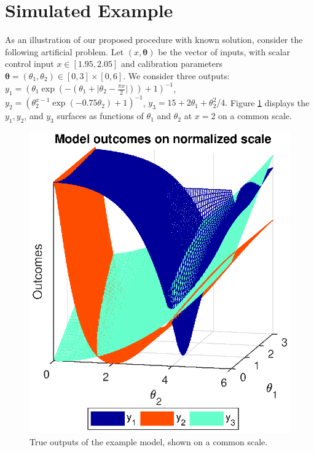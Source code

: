 \documentclass[12pt]{article}
\begin{document}
\section{Simulated Example}\label{example}
As an illustration of our proposed procedure with known solution, consider the following artificial problem. 
%
Let $(x,\boldsymbol \theta)$ be the vector of inputs, with scalar control input $x\in[1.95,2.05]$ and calibration parameters $\boldsymbol \theta = (\theta_1,\theta_2)\in[0,3]\times[0,6]$.
%
We consider three outputs:
%
$
y_1 = \left(\theta_1 \exp\left(-\left(\theta_1 + \lvert \theta_2-\frac{\pi x}2\rvert \right)\right)+1\right)^{-1}$, 
$
y_2 = \left(\theta_2^{x-1} \exp\left(-0.75 \theta_2\right) + 1 \right)^{-1}
$, 
$
y_3 = 15 + 2 \theta_1 + {\theta_2^2}/4.
$
%
Figure \ref{fig:toy_sim_outputs} displays the $y_1, y_2$, and $y_3$ surfaces as functions of $\theta_1$ and $\theta_2$ at $x = 2$ on a common scale.
%
\begin{figure}
\centering
\includegraphics[scale=.8]{FIG_toy_sim_model_outputs.eps}
\caption{True outputs of the example model, shown on a common scale.}
\label{fig:toy_sim_outputs}
\end{figure}
\end{document}
